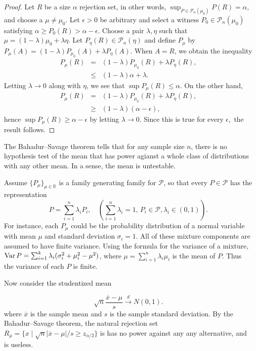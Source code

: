 \begin{proof}
Let $R$ be a size $\alpha$ rejection set, in other words, $\sup_{P\in\mathcal{P}_{n}(\mu_{0})}P(R)=\alpha$,
and choose a $\mu\neq\mu_{0}$. Let $\epsilon>0$ be arbitrary and
select a witness $P_{0}\in\mathcal{P}_{n}(\mu_{0})$ satisfying $\alpha\ge P_{0}(R)>\alpha-\epsilon$.
Choose a pair $\lambda,\eta$ such that $\mu=(1-\lambda)\mu_{0}+\lambda\eta$.
Let $P_{\eta}(R)\in\mathcal{P}_{n}(\eta)$ and define $P_{\mu}$ by
$P_{\mu}(A)=(1-\lambda)P_{\mu_{0}}(A)+\lambda P_{\eta}(A).$ When
$A=R$, we obtain the inequality
\begin{eqnarray*}
P_{\mu}(R) & = & (1-\lambda)P_{\mu_{0}}(R)+\lambda P_{\eta}(R),\\
 & \leq & (1-\lambda)\alpha+\lambda.
\end{eqnarray*}
Letting $\lambda\to0$ along with $\eta$, we see that $\sup P_{\mu}(R)\leq\alpha$.
On the other hand,
\begin{eqnarray*}
P_{\mu}(R) & = & (1-\lambda)P_{\mu_{0}}(R)+\lambda P_{\eta}(R),\\
 & \geq & (1-\lambda)(\alpha-\epsilon),
\end{eqnarray*}
hence $\sup P_{\mu}(R)\geq\alpha-\epsilon$ by letting $\lambda\to0$.
Since this is true for every $\epsilon,$ the result follows.
\end{proof}
The Bahadur--Savage theorem tells that for any sample size $n$,
there is no hypothesis test of the mean that has power agianst a whole
class of distributions with any other mean. In a sense, the mean is
untestable.

Assume $\{P_{\mu}\}_{\mu\in\mathbb{R}}$ is a family generating family
for $\mathcal{P}$, so that every $P\in\mathcal{P}$ has the representation
\[
P=\sum_{i=1}^{n}\lambda_{i}P_{i},\quad(\sum_{i=1}^{n}\lambda_{i}=1,\,P_{i}\in\mathcal{P},\lambda_{i}\in(0,1)).
\]
For instance, each $P_{\mu}$ could be the probability distribution
of a normal variable with mean $\mu$ and standard deviation $\sigma_{i}=1$.
All of these mixture components are assumed to have finite variance.
Using the formula for the variance of a mixture, $\operatorname{Var} P=\sum_{i=1}^{k}\lambda_{i}(\sigma_{i}^{2}+\mu_{i}^{2}-\mu^{2})$,
where $\mu=\sum_{i=1}^{n}\lambda_{i}\mu_{i}$ is the mean of $P$.
Thus the variance of each $P$ is finite. 

Now consider the studentized mean

\begin{equation}
\sqrt{n}\frac{\overline{x}-\mu}{s}\stackrel{d}{\to}N(0,1).\label{eq:studentized mean}
\end{equation}
where $\overline{x}$ is the sample mean and $s$ is the sample standard
deviation. By the Bahadur--Savage theorem, the natural rejection
set $R_{\mu}=\{x\mid\sqrt{n}|\overline{x}-\mu|/s\geq z_{\alpha/2}\}$
is has no power against any any alternative, and is useless.

